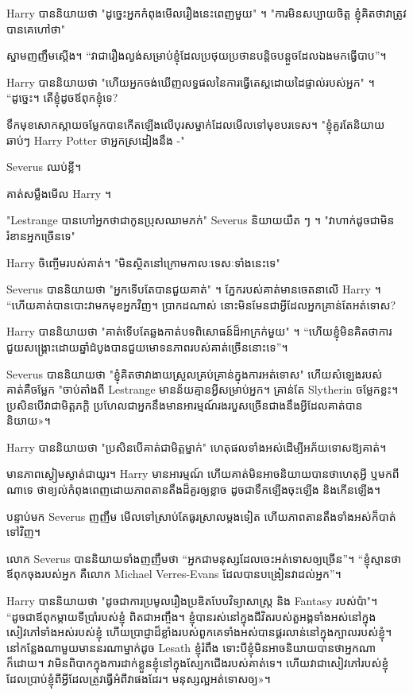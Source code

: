 {{{{{Harry បាននិយាយថា "ដូច្នេះអ្នកកំពុងមើលរឿងនេះពេញមួយ" ។ "ការមិនសប្បាយចិត្ត ខ្ញុំគិតថាវាត្រូវបានគេហៅថា"

ស្នាមញញឹមស្តើង។ “វា​ជា​រឿង​ល្ងង់​សម្រាប់​ខ្ញុំ​ដែល​ប្រថុយ​ប្រថាន​បន្តិច​បន្តួច​ដែល​ឯង​មក​ធ្វើ​បាប”។

Harry បាននិយាយថា "ហើយអ្នកចង់ឃើញលទ្ធផលនៃការធ្វើតេស្តដោយដៃផ្ទាល់របស់អ្នក" ។ “ដូច្នេះ។ តើខ្ញុំដូចឪពុកខ្ញុំទេ?

ទឹក​មុខ​សោក​ស្តាយ​ចម្លែក​បាន​កើត​ឡើង​លើ​បុរស​ម្នាក់​ដែល​មើល​ទៅ​មុខ​បរទេស។ "ខ្ញុំគួរតែនិយាយឆាប់ៗ Harry Potter ថាអ្នកស្រដៀងនឹង -"

Severus ឈប់ខ្លី។

គាត់សម្លឹងមើល Harry ។

"Lestrange បានហៅអ្នកថាជាកូនប្រុសឈាមភក់" Severus និយាយយឺត ៗ ។ "វាហាក់ដូចជាមិនរំខានអ្នកច្រើនទេ"

Harry ចិញ្ចើមរបស់គាត់។ "មិនស្ថិតនៅក្រោមកាលៈទេសៈទាំងនេះទេ"

Severus បាននិយាយថា "អ្នកទើបតែបានជួយគាត់" ។ ភ្នែករបស់គាត់មានចេតនាលើ Harry ។ “ហើយគាត់បានបោះវាមកមុខអ្នកវិញ។ ប្រាកដ​ណាស់ នោះ​មិន​មែន​ជា​អ្វី​ដែល​អ្នក​គ្រាន់​តែ​អត់​ទោស?

Harry បាននិយាយថា "គាត់ទើបតែឆ្លងកាត់បទពិសោធន៍ដ៏អាក្រក់មួយ" ។ “ហើយ​ខ្ញុំ​មិន​គិត​ថា​ការ​ជួយ​សង្គ្រោះ​ដោយ​ឆ្នាំ​ដំបូង​បាន​ជួយ​មោទនភាព​របស់​គាត់​ច្រើន​នោះ​ទេ”។

Severus បាននិយាយថា "ខ្ញុំគិតថាវាងាយស្រួលគ្រប់គ្រាន់ក្នុងការអត់ទោស" ហើយសំឡេងរបស់គាត់គឺចម្លែក "ចាប់តាំងពី Lestrange មានន័យគ្មានអ្វីសម្រាប់អ្នក។ គ្រាន់តែ Slytherin ចម្លែកខ្លះ។ ប្រសិន​បើ​វា​ជា​មិត្ត​ភក្តិ ប្រហែល​ជា​អ្នក​នឹង​មាន​អារម្មណ៍​រង​របួស​ច្រើន​ជាង​នឹង​អ្វី​ដែល​គាត់​បាន​និយាយ»។

Harry បាននិយាយថា "ប្រសិនបើគាត់ជាមិត្តម្នាក់" ហេតុផលទាំងអស់ដើម្បីអភ័យទោសឱ្យគាត់។

មានភាពស្ងៀមស្ងាត់ជាយូរ។ Harry មាន​អារម្មណ៍ ហើយ​គាត់​មិន​អាច​និយាយ​បាន​ថា​ហេតុអ្វី ឬ​មក​ពី​ណា​ទេ ថា​ខ្យល់​កំពុង​ពេញ​ដោយ​ភាព​តានតឹង​ដ៏​គួរ​ឲ្យ​ខ្លាច ដូច​ជា​ទឹក​ឡើង​ចុះ​ឡើង និង​កើនឡើង។

បន្ទាប់មក Severus ញញឹម មើលទៅស្រាប់តែធូរស្រាលម្តងទៀត ហើយភាពតានតឹងទាំងអស់ក៏បាត់ទៅវិញ។

លោក Severus បាននិយាយទាំងញញឹមថា “អ្នកជាមនុស្សដែលចេះអត់ទោសឲ្យច្រើន”។ “ខ្ញុំ​ស្មាន​ថា ឪពុក​ចុង​របស់​អ្នក គឺ​លោក Michael Verres-Evans ដែល​បាន​បង្រៀន​វា​ដល់​អ្នក”។

Harry បាននិយាយថា "ដូចជាការប្រមូលរឿងប្រឌិតបែបវិទ្យាសាស្ត្រ និង Fantasy របស់ប៉ា"។ “ដូចជាឪពុកម្តាយទីប្រាំរបស់ខ្ញុំ ពិតជាអញ្ចឹង។ ខ្ញុំបានរស់នៅក្នុងជីវិតរបស់តួអង្គទាំងអស់នៅក្នុងសៀវភៅទាំងអស់របស់ខ្ញុំ ហើយប្រាជ្ញាដ៏ខ្លាំងរបស់ពួកគេទាំងអស់បានផ្គរលាន់នៅក្នុងក្បាលរបស់ខ្ញុំ។ នៅកន្លែងណាមួយមាននរណាម្នាក់ដូច Lesath ខ្ញុំរំពឹង ទោះបីខ្ញុំមិនអាចនិយាយបានថាអ្នកណាក៏ដោយ។ វាមិនពិបាកក្នុងការដាក់ខ្លួនខ្ញុំនៅក្នុងស្បែកជើងរបស់គាត់ទេ។ ហើយវាជាសៀវភៅរបស់ខ្ញុំដែលប្រាប់ខ្ញុំពីអ្វីដែលត្រូវធ្វើអំពីវាផងដែរ។ មនុស្ស​ល្អ​អត់​ទោស​ឲ្យ​»។

}}}}}
